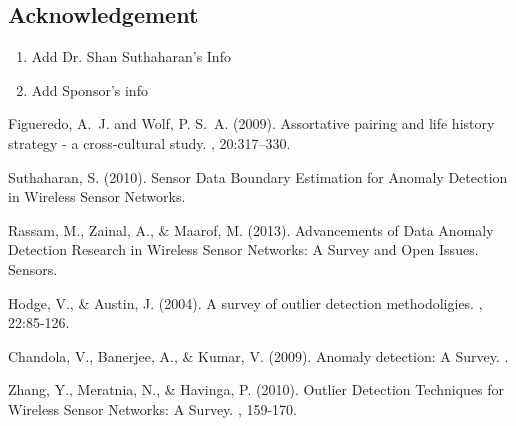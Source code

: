 \documentclass[twoside]{article}
\begin{document}
\begin{multicols}{2}
\section{Acknowledgement}

\begin{enumerate}
	\item Add Dr. Shan Suthaharan's Info
	\item Add Sponsor's info
\end{enumerate}


\begin{thebibliography}{99} %

Figueredo, A.~J. and Wolf, P. S.~A. (2009).
\newblock Assortative pairing and life history strategy - a cross-cultural
  study.
, 20:317--330.
 
 Suthaharan, S. (2010).
 \newblock Sensor Data Boundary Estimation for Anomaly Detection in Wireless Sensor Networks.
 
 Rassam, M., Zainal, A., \& Maarof, M. (2013).
 \newblock Advancements of Data Anomaly Detection Research in Wireless Sensor Networks: A Survey and Open Issues. Sensors.
 
 Hodge, V., \& Austin, J. (2004).
 \newblock A survey of outlier detection methodoligies.
 , 22:85-126.
 
 Chandola, V., Banerjee, A., \& Kumar, V. (2009).
 \newblock Anomaly detection: A Survey.
 .
 
 Zhang, Y., Meratnia, N., \& Havinga, P. (2010).
 \newblock Outlier Detection Techniques for Wireless Sensor Networks: A Survey.
 , 159-170.
 
\end{thebibliography}


\end{multicols}
\end{document}
